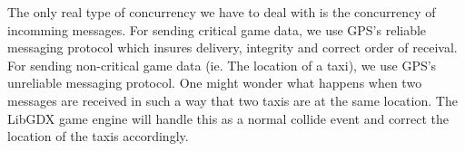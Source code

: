 The only real type of concurrency we have to deal with is the concurrency of incomming messages. For sending critical game data, we use GPS's reliable messaging protocol which insures delivery, integrity and correct order of receival. For sending non-critical game data (ie. The location of a taxi),  we use GPS's unreliable messaging protocol. One might wonder what happens when two messages are received in such a way that two taxis are at the same location. The LibGDX game engine will handle this as a normal collide event and correct the location of the taxis accordingly.